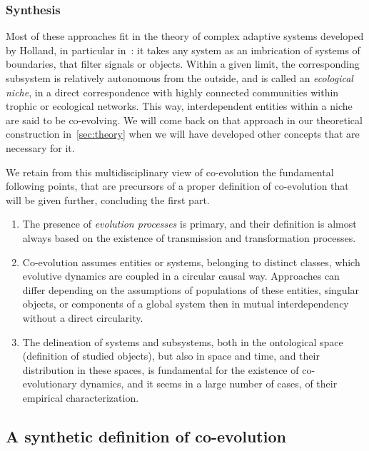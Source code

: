\documentclass[letterpaper]{article}
\begin{document}
\subsubsection{Synthesis}

Most of these approaches fit in the theory of complex adaptive systems developed by Holland, in particular in~\cite{holland2012signals}: it takes any system as an imbrication of systems of boundaries, that filter signals or objects. Within a given limit, the corresponding subsystem is relatively autonomous from the outside, and is called an \emph{ecological niche}, in a direct correspondence with highly connected communities within trophic or ecological networks. This way, interdependent entities within a niche are said to be co-evolving. We will come back on that approach in our theoretical construction in~\ref{sec:theory} when we will have developed other concepts that are necessary for it.


We retain from this multidisciplinary view of co-evolution the fundamental following points, that are precursors of a proper definition of co-evolution that will be given further, concluding the first part.

\begin{enumerate}
	\item The presence of \emph{evolution processes} is primary, and their definition is almost always based on the existence of transmission and transformation processes.
	\item Co-evolution assumes entities or systems, belonging to distinct classes, which evolutive dynamics are coupled in a circular causal way. Approaches can differ depending on the assumptions of populations of these entities, singular objects, or components of a global system then in mutual interdependency without a direct circularity.
	\item The delineation of systems and subsystems, both in the ontological space (definition of studied objects), but also in space and time, and their distribution in these spaces, is fundamental for the existence of co-evolutionary dynamics, and it seems in a large number of cases, of their empirical characterization.
\end{enumerate}




\subsection{A synthetic definition of co-evolution}
\end{document}
